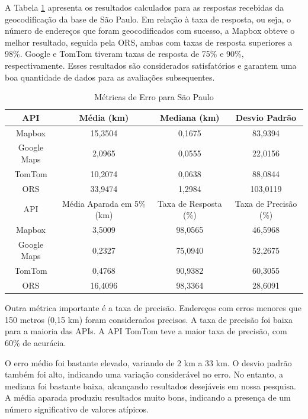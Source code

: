 A Tabela \ref{tab:tabelaDeMetricasSP} apresenta os resultados calculados para as respostas recebidas da geocodificação da base de São Paulo. Em relação à taxa de resposta, ou seja, o número de endereços que foram geocodificados com sucesso, a Mapbox obteve o melhor resultado, seguida pela ORS, ambas com taxas de resposta superiores a 98\%. Google e TomTom tiveram taxas de resposta de 75\% e 90\%, respectivamente. Esses resultados são considerados satisfatórios e garantem uma boa quantidade de dados para as avaliações subsequentes.

\begin{table}[!ht]
    \centering
    \caption{Métricas de Erro para São Paulo}
    \label{tab:tabelaDeMetricasSP}
    \begin{adjustbox}{width=0.7\textwidth}
    \begin{tabular}{|c|c|c|c|}
    \hline
    API & Média (km) & Mediana (km) & Desvio Padrão \\
    \hline
    Mapbox & 15,3504 & 0,1675 & 83,9394 \\
    Google Maps & 2,0965 & 0,0555 & 22,0156 \\
    TomTom & 10,2074 & 0,0638 & 88,0844 \\
    ORS & 33,9474 & 1,2984 & 103,0119 \\
    \hline
    \hline
    API & Média Aparada em 5\% (km) & Taxa de Resposta (\%) & Taxa de Precisão (\%) \\
    \hline
    Mapbox & 3,5009 & 98,0565 & 46,5968 \\
    Google Maps & 0,2327 & 75,0940 & 52,2675 \\
    TomTom & 0,4768 & 90,9382 & 60,3055 \\
    ORS & 16,4096 & 98,3364 & 28,6091 \\
    \hline
    \end{tabular}
    \end{adjustbox}
\end{table}

Outra métrica importante é a taxa de precisão. Endereços com erros menores que 150 metros (0,15 km) foram considerados precisos. A taxa de precisão foi baixa para a maioria das APIs. A API TomTom teve a maior taxa de precisão, com 60\% de acurácia.

O erro médio foi bastante elevado, variando de 2 km a 33 km. O desvio padrão também foi alto, indicando uma variação considerável no erro. No entanto, a mediana foi bastante baixa, alcançando resultados desejáveis em nossa pesquisa. A média aparada produziu resultados muito bons, indicando a presença de um número significativo de valores atípicos.

